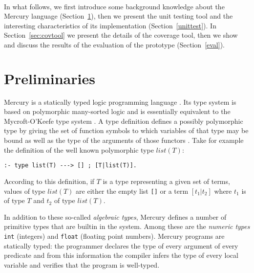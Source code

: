 \documentclass[british]{llncs}
\begin{document}
\paragraph*{}
In what follows, we first introduce some background knowledge about the Mercury language (Section~\ref{prelim}), then we present the unit testing tool and the interesting characteristics of its implementation (Section~\ref{unittest}). In Section~\ref{sec:covtool} we present the details of the coverage tool, then we show and discuss the results of the evaluation of the prototype (Section~\ref{eval}).

\section{Preliminaries}\label{prelim}

Mercury is a statically typed logic programming language \cite{mercury:jlp}.
Its type system is based on polymorphic many-sorted logic and is essentially
equivalent to the Mycroft-O'Keefe type system \cite{mycroft:typesprolog}.
A type definition defines a possibly polymorphic type by giving the
set of function symbols to which variables of that type may be bound
as well as the type of the arguments of those functors \cite{mercury:jlp}.
Take for example the definition of the well known polymorphic type
$list(T)$:


\begin{lstlisting}[basicstyle={\ttfamily},breaklines=true,tabsize=4]
:- type list(T) ---> [] ; [T|list(T)].
\end{lstlisting}


\noindent According to this definition, if $T$ is a type representing
a given set of terms, values of type $list(T)$ are either the empty
list \texttt{{[}{]}} or a term $[t_{1}|t_{2}]$ where $t_{1}$ is
of type $T$ and $t_{2}$ of type $list(T)$.

In addition to these so-called \emph{algebraic types}, Mercury defines
a number of primitive types that are builtin in the system. Among
these are the \emph{numeric types} \texttt{int} (integers) and \texttt{float}
(floating point numbers). Mercury programs are statically typed: the
programmer declares the type of every argument of every predicate
and from this information the compiler infers the type of every local
variable and verifies that the program is well-typed.
\end{document}
